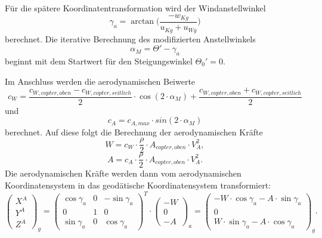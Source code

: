 Für die spätere Koordinatentransformation wird der Windanstellwinkel
\begin{equation}
	\gamma_a = \arctan \Big(\frac{-w_{Kg}}{u_{Kg}+u_{Wg}}\Big)
\end{equation}
berechnet.
Die iterative Berechnung des modifizierten Anstellwinkels 
\begin{equation}
	\alpha_M = \Theta '-\gamma_a
\end{equation} 
beginnt mit dem Startwert für den Steigungswinkel \ensuremath{\Theta_0'=0}.

Im Anschluss werden die aerodynamischen Beiwerte 
\begin{equation}
	c_W = \frac{c_{W,copter,oben}-c_{W,copter,seitlich}}{2}\cdot \cos(2\cdot \alpha_M)+\frac{c_{W,copter,oben}+c_{W,copter,seitlich}}{2}
\end{equation} und 
\begin{equation}
	c_A = c_{A,max}\cdot sin(2\cdot \alpha_M)
\end{equation}
berechnet. Auf diese folgt die Berechnung der aerodynamischen Kräfte
\begin{equation}
	W = c_W\cdot \frac{\rho}{2}\cdot A_{copter,oben}\cdot V_A^2,
\end{equation}
\begin{equation}
	A = c_A\cdot \frac{\rho}{2}\cdot A_{copter,oben}\cdot V_A^2.
\end{equation}
Die aerodynamischen Kräfte werden dann vom aerodynamischen Koordinatensystem in das geodätische Koordinatensystem transformiert:
\begin{equation}
	\begin{pmatrix} X^A \\ Y^A \\Z^A \end{pmatrix}_g = \begin{pmatrix} \cos\gamma_a & 0 & -\sin\gamma_a \\ 0 & 1 & 0 \\ \sin\gamma_a & 0 & \cos\gamma_a \end{pmatrix}^T\cdot \begin{pmatrix} -W \\ 0 \\ -A \end{pmatrix}_a = \begin{pmatrix} -W\cdot\cos\gamma_a-A\cdot\sin\gamma_a \\ 0 \\ W\cdot\sin\gamma_a-A\cdot\cos\gamma_a \end{pmatrix}_g.
\end{equation}
